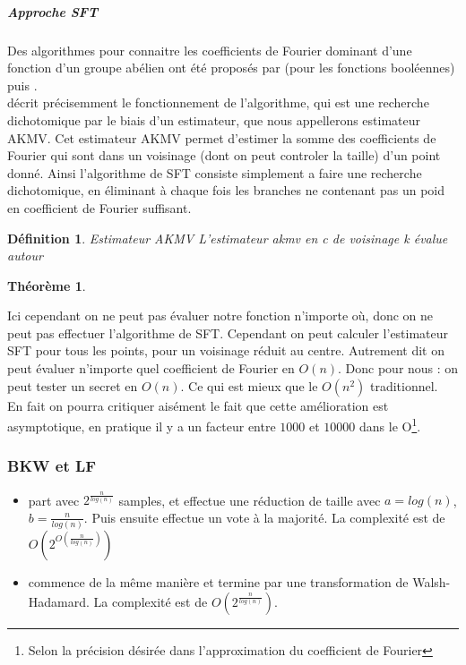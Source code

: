 \documentclass{article}		%
\newtheorem{defi}{Définition}
\theoremstyle{definition}
\newtheorem{theo}{Théorème}
\theoremstyle{plain}
\begin{document}
\subparagraph{Approche SFT}
\label{SFT}
Des algorithmes pour connaitre les coefficients de Fourier dominant d'une fonction d'un groupe
abélien ont été proposés par \cite{Mansour} (pour les fonctions booléennes)
puis  \cite{Akavia}.
\\
\cite{Vaudenay} décrit précisemment le fonctionnement de
l'algorithme, qui est une recherche dichotomique par le biais d'un
estimateur, que nous appellerons estimateur AKMV. Cet estimateur AKMV
permet d'estimer la somme des coefficients de Fourier qui sont dans un
voisinage (dont on peut controler la taille) d'un point donné. Ainsi
l'algorithme de SFT consiste simplement a faire une recherche
dichotomique, en éliminant à chaque fois les branches ne contenant pas un
poid en coefficient de Fourier suffisant.
\begin{defi}{Estimateur AKMV}
 L'estimateur akmv en c de voisinage k évalue autour
\end{defi}
\begin{theo}
\end{theo}
Ici cependant on ne peut pas évaluer notre fonction n'importe où, donc on
ne peut pas effectuer l'algorithme de SFT. Cependant on peut calculer
l'estimateur SFT pour tous les points, pour un voisinage réduit au
centre.  Autrement dit on peut évaluer n'importe quel coefficient de
Fourier en $O(n)$. Donc pour nous : on peut tester un secret en $O(n)$.
Ce qui est mieux que le $O(n^2)$ traditionnel. \\
En fait on pourra critiquer aisément le fait que cette amélioration est
asymptotique, en pratique il y a un facteur entre $1000$ et $10000$ dans
le O\footnote{Selon la précision désirée dans l'approximation du
coefficient de Fourier}. 
\subsubsection{BKW et LF}
\begin{itemize}
\item \cite{BKW} part avec $2^\frac{n}{log(n)}$ samples, et effectue une
réduction de taille avec $a=log(n)$, $b = \frac{n}{log(n)}$.
 Puis ensuite effectue un vote à la majorité. La complexité
est de $O(2^{O(\frac {n} {log(n)})})$   
\item \cite{LF} commence de la même manière et termine par une
transformation de Walsh-Hadamard. La complexité est de
$O(2^\frac{n}{log(n)})$.
\end{itemize}
\end{document}
